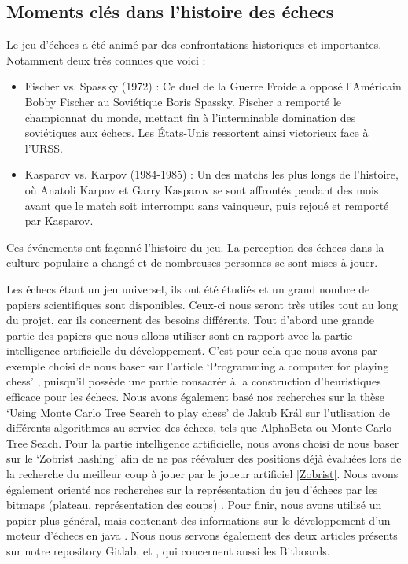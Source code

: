 \documentclass{article}
\begin{document}
\subsection{Moments clés dans l’histoire des échecs}
Le jeu d’échecs a été animé par des confrontations historiques et importantes. Notamment deux très connues que voici :
\begin{itemize}
    \item Fischer vs. Spassky (1972) : Ce duel de la Guerre Froide a opposé l’Américain Bobby Fischer au Soviétique
    Boris Spassky. Fischer a remporté le championnat du monde, mettant fin à l'interminable domination des soviétiques
    aux échecs. Les États-Unis ressortent ainsi victorieux face à l'URSS.
    \item Kasparov vs. Karpov (1984-1985) : Un des matchs les plus longs de l’histoire, où Anatoli Karpov et Garry Kasparov
    se sont affrontés pendant des mois avant que le match soit interrompu sans vainqueur, puis rejoué et remporté par Kasparov.
\end{itemize}
Ces événements ont façonné l’histoire du jeu. La perception des échecs dans la culture populaire a changé et de nombreuses
personnes se sont mises à jouer.

Les échecs étant un jeu universel, ils ont été étudiés et un grand nombre de papiers scientifiques
sont disponibles. Ceux-ci nous seront très utiles tout au long du projet, car ils concernent des
besoins différents. Tout d'abord une grande partie des papiers que nous allons utiliser sont en rapport
avec la partie intelligence artificielle du développement. C'est pour cela que nous avons par exemple
choisi de nous baser sur l'article `Programming a computer for playing chess' \cite{Shannon1950}, 
puisqu'il possède une partie consacrée à la construction d'heuristiques efficace pour les échecs.
Nous avons également basé nos recherches sur la thèse `Using Monte Carlo Tree Search to play chess' \cite{Kral2021}
de Jakub Král sur l'utlisation de différents algorithmes au service des échecs, tels que AlphaBeta ou
Monte Carlo Tree Seach. Pour la partie intelligence artificielle, nous avons choisi de nous baser sur le 
`Zobrist hashing' \cite{ZobristHashing} afin de ne pas réévaluer des positions déjà évaluées lors de la 
recherche du meilleur coup à jouer par le joueur artificiel \ref{Zobrist}. Nous avons également orienté
nos recherches sur la représentation du jeu d'échecs par les bitmaps (plateau, représentation des coups) \cite{Bijl2021}.
Pour finir, nous avons utilisé un papier plus général, mais contenant des informations sur le développement
d'un moteur d'échecs en java \cite{PaulDailly}. Nous nous servons également des deux articles présents sur 
notre repository Gitlab, \cite{Bitboards} et \cite{GameBitboards}, qui concernent aussi les Bitboards.
\end{document}
